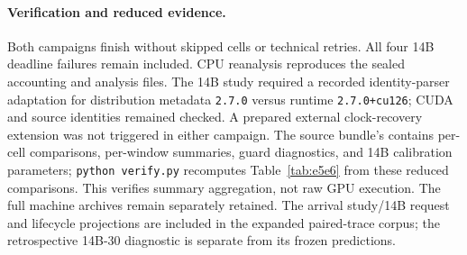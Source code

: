 \paragraph{Verification and reduced evidence.}
Both campaigns finish without skipped cells or technical retries. All four
14B deadline failures remain included. CPU reanalysis reproduces the sealed
accounting and analysis files. The 14B study required a recorded identity-parser
adaptation for distribution metadata \texttt{2.7.0} versus runtime
\texttt{2.7.0+cu126}; CUDA and source identities remained checked. A prepared
external clock-recovery extension was not triggered in either campaign.
The source bundle's  contains per-cell comparisons,
per-window summaries, guard diagnostics, and 14B calibration parameters;
\texttt{python verify.py} recomputes Table~\ref{tab:e5e6} from these reduced
comparisons. This verifies summary aggregation, not raw GPU execution.
The full machine archives remain separately retained. The arrival study/14B request and
lifecycle projections are included in the expanded paired-trace corpus;
the retrospective 14B-30 diagnostic is separate from its frozen predictions.
